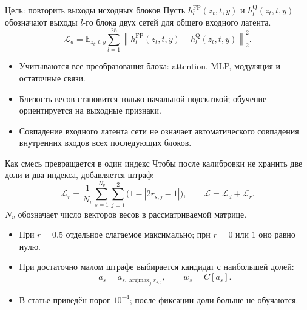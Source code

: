 \documentclass[aspectratio=169,10pt]{beamer}
\newcommand{\takeaway}[1]{\par\vspace{1.5mm}{\bfseries #1\par}}
\newcommand{\tights}{\setlength{\itemsep}{1.4mm}\setlength{\parsep}{0pt}\setlength{\parskip}{0pt}}
\DeclareMathOperator{\argmax}{arg\,max}
\begin{document}
\begin{frame}[t]{Цель: повторить выходы исходных блоков}
  Пусть $h_l^{\mathrm{FP}}(z_t,t,y)$ и $h_l^{\mathrm Q}(z_t,t,y)$ обозначают
  выходы $l$-го блока двух сетей для общего входного латента.
  \[
    \mathcal L_d=
    \mathbb E_{z_t,t,y}\sum_{l=1}^{28}
      \left\|h_l^{\mathrm{FP}}(z_t,t,y)-h_l^{\mathrm Q}(z_t,t,y)\right\|_2^2.
  \]
  \begin{itemize}\tights
    \item Учитываются все преобразования блока: attention, MLP, модуляция и остаточные связи.
    \item Близость весов становится только начальной подсказкой;
    обучение ориентируется на выходные признаки.
    \item Совпадение входного латента сети не означает автоматического совпадения
    внутренних входов всех последующих блоков.
  \end{itemize}
  \takeaway{Это цель по промежуточным признакам,\par
  а не ошибка предсказания добавленного шума всей DiT.}
\end{frame}

\begin{frame}[t]{Как смесь превращается в один индекс}
  Чтобы после калибровки не хранить две доли и два индекса, добавляется штраф:
  \[
    \mathcal L_r=\frac1{N_v}\sum_{s=1}^{N_v}\sum_{j=1}^{2}
      \bigl(1-|2r_{s,j}-1|\bigr),\qquad
    \mathcal L=\mathcal L_d+\mathcal L_r.
  \]
  $N_v$ обозначает число векторов весов в рассматриваемой матрице.
  \begin{itemize}\tights
    \item При $r=0.5$ отдельное слагаемое максимально; при $r=0$ или $1$ оно равно нулю.
    \item При достаточно малом штрафе выбирается кандидат с наибольшей долей:
    \[
      a_s=a_{s,\argmax_j r_{s,j}},\qquad \widehat w_s=C[a_s].
    \]
    \item В статье приведён порог $10^{-4}$; после фиксации доли больше не обучаются.
  \end{itemize}
  \takeaway{Смесь нужна только для обучения.\par
  На генерации снова используются кодбук и один индекс.}
\end{frame}
\end{document}
